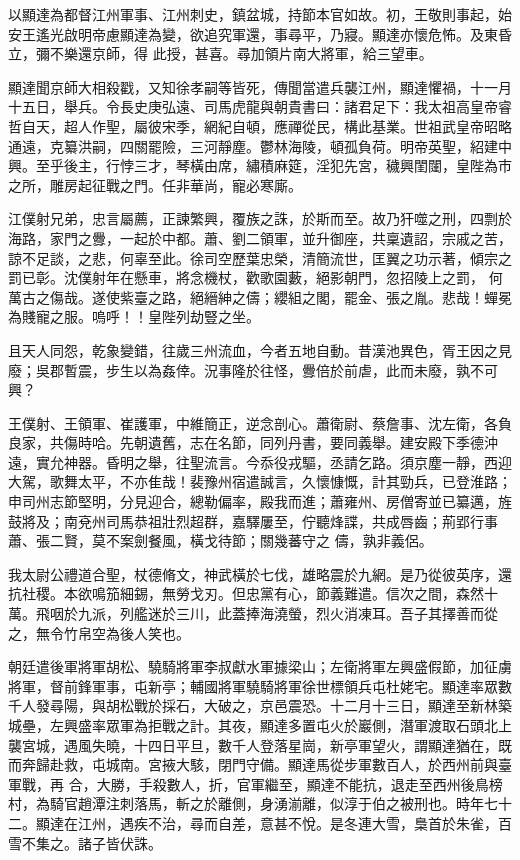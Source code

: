 \begin{pinyinscope}
 以顯達為都督江州軍事、江州刺史，鎮盆城，持節本官如故。初，王敬則事起，始安王遙光啟明帝慮顯達為變，欲追究軍還，事尋平，乃寢。顯達亦懷危怖。及東昏立，彌不樂還京師，得
 此授，甚喜。尋加領片南大將軍，給三望車。



 顯達聞京師大相殺戳，又知徐孝嗣等皆死，傳聞當遣兵襲江州，顯達懼禍，十一月十五日，舉兵。令長史庚弘遠、司馬虎龍與朝貴書曰：諸君足下：我太祖高皇帝睿哲自天，超人作聖，屬彼宋季，網紀自頓，應禪從民，構此基業。世祖武皇帝昭略通遠，克纂洪嗣，四關罷險，三河靜塵。鬱林海陵，頓孤負荷。明帝英聖，紹建中興。至乎後主，行悖三才，琴橫由席，繡積麻筵，淫犯先宮，穢興閨闥，皇陛為市之所，雕房起征戰之門。任非華尚，寵必寒廝。



 江僕射兄弟，忠言屬薦，正諫繁興，覆族之誅，於斯而至。故乃犴噬之刑，四剽於海路，家門之釁，一起於中都。蕭、劉二領軍，並升御座，共稟遺詔，宗戚之苦，諒不足談，之悲，何辜至此。徐司空歷葉忠榮，清簡流世，匡翼之功示著，傾宗之罰已彰。沈僕射年在懸車，將念機杖，歡歌園藪，絕影朝門，忽招陵上之罰，
 何萬古之傷哉。遂使紫臺之路，絕縉紳之儔；纓組之閣，罷金、張之胤。悲哉！蟬冕為賤寵之服。嗚呼！！皇陛列劫豎之坐。



 且天人同怨，乾象變錯，往歲三州流血，今者五地自動。昔漢池異色，胥王因之見廢；吳郡暫震，步生以為姦倖。況事隆於往怪，釁倍於前虐，此而未廢，孰不可興？



 王僕射、王領軍、崔護軍，中維簡正，逆念剖心。蕭衛尉、蔡詹事、沈左衛，各負良家，共傷時哈。先朝遺舊，志在名節，同列丹書，要同義舉。建安殿下季德沖遠，實允神器。昏明之舉，往聖流言。今忝役戎驅，丞請乞路。須京塵一靜，西迎大駕，歌舞太平，不亦隹哉！裴豫州宿遣誠言，久懷慷慨，計其勁兵，已登淮路；申司州志節堅明，分見迎合，總勒偏率，殿我而進；蕭雍州、房僧寄並已纂邁，旌鼓將及；南兗州司馬恭祖壯烈超群，嘉驛屢至，佇聽烽諜，共成唇齒；荊郢行事蕭、張二賢，莫不案劍餐風，橫戈待節；關幾蕃守之
 儔，孰非義侶。



 我太尉公禮道合聖，杖德脩文，神武橫於七伐，雄略震於九網。是乃從彼英序，還抗社稷。本欲鳴笳細錫，無勞戈刃。但忠黨有心，節義難遣。信次之間，森然十萬。飛咽於九派，列艦迷於三川，此蓋捧海澆螢，烈火消凍耳。吾子其擇善而從之，無令竹帛空為後人笑也。



 朝廷遣後軍將軍胡松、驍騎將軍李叔獻水軍據梁山；左衛將軍左興盛假節，加征虜將軍，督前鋒軍事，屯新亭；輔國將軍驍騎將軍徐世標領兵屯杜姥宅。顯達率眾數千人發尋陽，與胡松戰於採石，大破之，京邑震恐。十二月十三日，顯達至新林築城壘，左興盛率眾軍為拒戰之計。其夜，顯達多置屯火於巖側，潛軍渡取石頭北上襲宮城，遇風失曉，十四日平旦，數千人登落星崗，新亭軍望火，謂顯達猶在，既而奔歸赴救，屯城南。宮掖大駭，閉門守備。顯達馬從步軍數百人，於西州前與臺軍戰，再
 合，大勝，手殺數人，折，官軍繼至，顯達不能抗，退走至西州後鳥榜村，為騎官趙潭注刺落馬，斬之於離側，身湧湔離，似淳于伯之被刑也。時年七十二。顯達在江州，遇疾不治，尋而自差，意甚不悅。是冬連大雪，梟首於朱雀，百雪不集之。諸子皆伏誅。




\end{pinyinscope}
